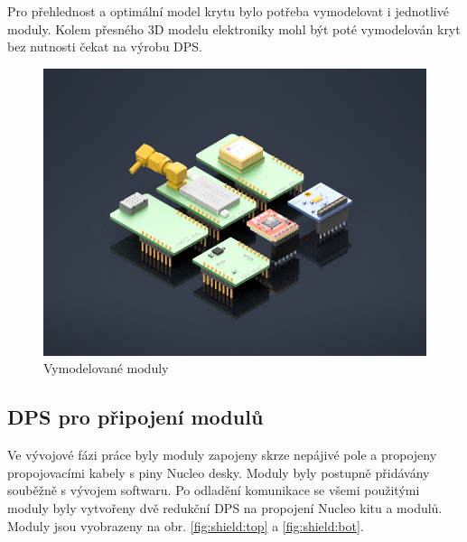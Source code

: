 \documentclass[twoside]{ctuthesis}
\theoremstyle{plain}
\theoremstyle{definition}
\theoremstyle{note}
\begin{document}
			Pro přehlednost a optimální model krytu bylo potřeba vymodelovat i jednotlivé moduly. Kolem přesného 3D modelu elektroniky mohl být poté vymodelován kryt bez nutnosti čekat na výrobu DPS.
			\begin{figure}[hbtp]
				\centering
				\includegraphics[width=.7\linewidth]{Figures/modules_assembly.png} 
				\caption{Vymodelované moduly}
				\label{fig:modules:assembly}
			\end{figure}
		

		
		\subsection{DPS pro připojení modulů}
		Ve vývojové fázi práce byly moduly zapojeny skrze nepájivé pole a propojeny propojovacími kabely s piny Nucleo desky. Moduly byly postupně přidávány souběžně s vývojem softwaru. Po odladění komunikace se všemi použitými moduly byly vytvořeny dvě redukční DPS na propojení Nucleo kitu a modulů. Moduly jsou vyobrazeny na obr. \ref{fig:shield:top} a \ref{fig:shield:bot}. 
\end{document}
